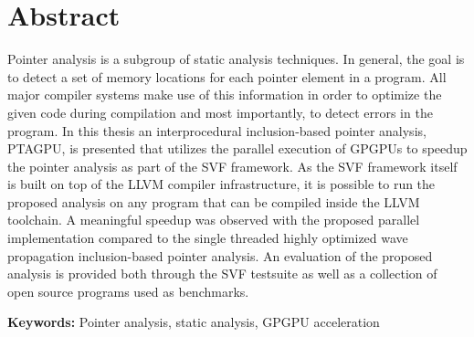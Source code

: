 \chapter*{Abstract}

Pointer analysis is a subgroup of static analysis techniques. 
In general, the goal is to detect a set of memory locations for each pointer element in a program. 
All major compiler systems make use of this information in order to optimize the given code during compilation
and most importantly, to detect errors in the program.
In this thesis an interprocedural inclusion-based pointer analysis, PTAGPU, is presented that utilizes the parallel execution of GPGPUs to speedup the pointer analysis as part of the SVF framework. 
As the SVF framework itself is built on top of the LLVM compiler infrastructure, 
it is possible to run the proposed analysis on any program that can be compiled inside the LLVM toolchain.
A meaningful speedup was observed with the proposed parallel implementation compared to the single threaded highly optimized wave propagation inclusion-based pointer analysis.
An evaluation of the proposed analysis is provided both through the SVF testsuite as well as a collection of open source programs used as benchmarks.

\textbf{Keywords:} Pointer analysis, static analysis, GPGPU acceleration